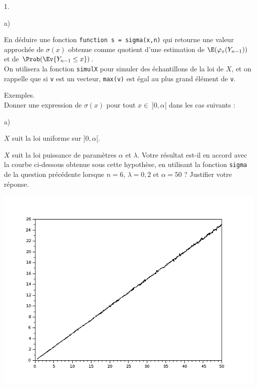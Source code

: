 \begin{noliste}{1.}
\begin{noliste}{a)}
    
    
    

    
    \item En déduire une fonction \Scilab{} {\tt function s = 
    sigma(x,n)} qui retourne une valeur approchée de $\sigma(x)$
    obtenue comme quotient d'une estimation de $\E(\varphi_x(Y_{n-1}))$
    et de $\Prob(\Ev{Y_{n-1} \leq x})$.\\
    On utilisera la fonction {\tt simulX} pour simuler des 
    échantillons de la loi de $X$, et on rappelle que si {\tt v} est 
    un vecteur, {\tt max(v)} est égal au plus grand élément de 
    {\tt v}.
    
    
  \end{noliste}
  
  
  
  
  \item Exemples.\\
  Donner une expression de $\sigma(x)$ pour tout $x \in \ ]0,\alpha[$
  dans les cas suivants : 
  \begin{noliste}{a)}
    \setlength{\itemsep}{2mm}
    \item $X$ suit la loi uniforme sur $]0,\alpha[$.
    
    

    
    \item $X$ suit la loi puissance de paramètres $\alpha$ et $\lambda$.
    Votre résultat est-il en accord avec la courbe ci-dessous 
    obtenue sous cette hypothèse, en utilisant la fonction {\tt sigma}
    de la question précédente lorsque $n=6$, $\lambda=0,2$ et 
    $\alpha = 50$ ? Justifier votre réponse.
    
    \begin{center}
      \includegraphics[scale=.5]
      {Figures/ESSEC-I_2018/Figure_ESSEC-I_2018.png}
    \end{center}
    
    
    
    
    
  \end{noliste}
\end{noliste}



